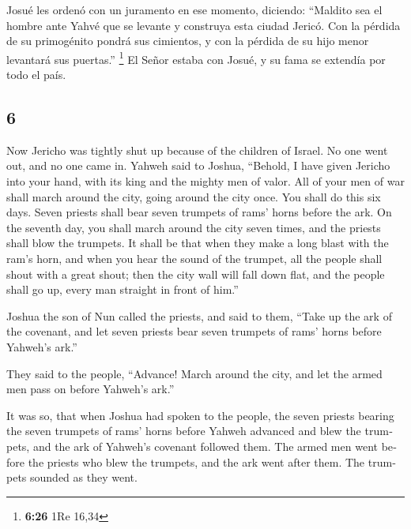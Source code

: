 \begin{paracol}{2}
 Josué les ordenó con un juramento en ese momento,
diciendo: ``Maldito sea el hombre ante Yahvé que se levante y construya
esta ciudad Jericó. Con la pérdida de su primogénito pondrá sus
cimientos, y con la pérdida de su hijo menor levantará sus puertas.''
\footnote{\textbf{6:26} 1Re 16,34}  El Señor estaba con
Josué, y su fama se extendía por todo el país.

\switchcolumn
\begin{otherlanguage}{english}

\hypertarget{section-11}{%
\section{6}\label{section-11}}

 Now Jericho was tightly shut up because of the children
of Israel. No one went out, and no one came in.  Yahweh
said to Joshua, ``Behold, I have given Jericho into your hand, with its
king and the mighty men of valor.  All of your men of war
shall march around the city, going around the city once. You shall do
this six days.  Seven priests shall bear seven trumpets of
rams' horns before the ark. On the seventh day, you shall march around
the city seven times, and the priests shall blow the trumpets.
 It shall be that when they make a long blast with the
ram's horn, and when you hear the sound of the trumpet, all the people
shall shout with a great shout; then the city wall will fall down flat,
and the people shall go up, every man straight in front of him.''

 Joshua the son of Nun called the priests, and said to
them, ``Take up the ark of the covenant, and let seven priests bear
seven trumpets of rams' horns before Yahweh's ark.''

 They said to the people, ``Advance! March around the
city, and let the armed men pass on before Yahweh's ark.''

 It was so, that when Joshua had spoken to the people, the
seven priests bearing the seven trumpets of rams' horns before Yahweh
advanced and blew the trumpets, and the ark of Yahweh's covenant
followed them.  The armed men went before the priests who
blew the trumpets, and the ark went after them. The trumpets sounded as
they went.


\end{otherlanguage}
\end{paracol}
